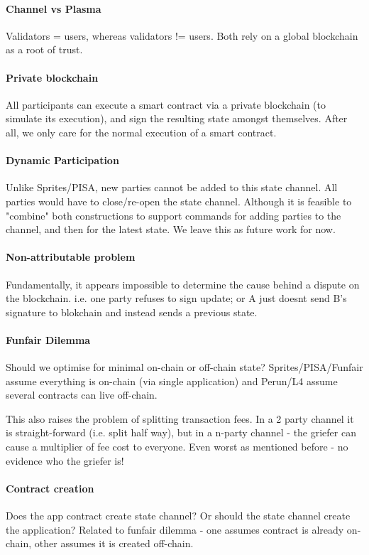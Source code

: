 \documentclass{llncs}
\begin{document}
\paragraph{Channel vs Plasma} Validators = users, whereas validators != users. Both rely on a global blockchain as a root of trust. 

\paragraph{Private blockchain} All participants can execute a smart contract via a private blockchain (to simulate its execution), and sign the resulting state amongst themselves. After all, we only care for the normal execution of a smart contract. 

\paragraph{Dynamic Participation} Unlike Sprites/PISA, new parties cannot be added to this state channel. All parties would have to close/re-open the state channel. Although it is feasible to "combine" both constructions to support commands for adding parties to the channel, and then for the latest state. We leave this as future work for now. 


\paragraph{Non-attributable problem} Fundamentally, it appears impossible to determine the cause behind a dispute on the blockchain. i.e. one party refuses to sign update; or A just doesnt send B's signature to blokchain and instead sends a previous state.

\paragraph{Funfair Dilemma} Should we optimise for minimal on-chain or off-chain state? Sprites/PISA/Funfair assume everything is on-chain (via single application) and Perun/L4 assume several contracts can live off-chain. 

This also raises the problem of splitting transaction fees. In a 2 party channel it is straight-forward (i.e. split half way), but in a n-party channel - the griefer can cause a multiplier of fee cost to everyone. Even worst as mentioned before - no evidence who the griefer is! 

\paragraph{Contract creation} Does the app contract create state channel? Or should the state channel create the application? Related to funfair dilemma - one assumes contract is already on-chain, other assumes it is created off-chain. 
\end{document}
